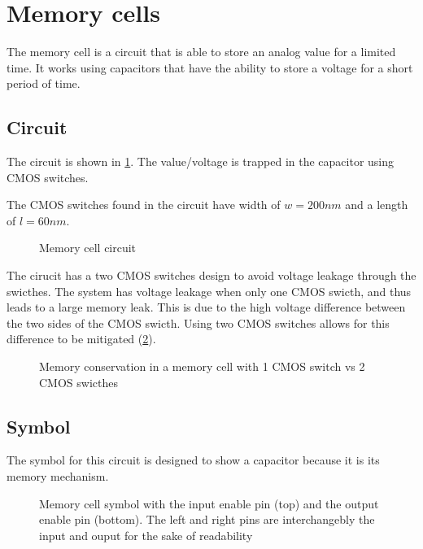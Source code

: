 \section{Memory cells}
\label{sec:memcell}

The memory cell is a circuit that is able to store an analog value for a limited time. It works using capacitors that have the ability to store a voltage for a short period of time.

\subsection{Circuit}

The circuit is shown in \cref{circt:memcell}. The value/voltage is trapped in the capacitor using \ac{CMOS} switches.

The \ac{CMOS} switches found in the circuit have width of $w=200nm$ and a length of $l=60nm$.

\begin{figure}[H]
  \centering
  
  \caption{Memory cell circuit}
  \label{circt:memcell}
\end{figure}

The cirucit has a two \ac{CMOS} switches design to avoid voltage leakage through the swicthes. The system has voltage leakage when only one \ac{CMOS} swicth, and thus leads to a large memory leak. This is due to the high voltage difference between the two sides of the \ac{CMOS} swicth. Using two \ac{CMOS} switches allows for this difference to be mitigated (\cref{fig:memcellLoss}).

\begin{figure}[H]
  \centering
  
  \caption{Memory conservation in a memory cell with 1 \ac{CMOS} switch vs 2 \ac{CMOS} swicthes}
  \label{fig:memcellLoss}
\end{figure}

\subsection{Symbol}

The symbol for this circuit is designed to show a capacitor because it is its memory mechanism.

\begin{figure}[H]
  \centering
  
  \caption{Memory cell symbol with the input enable pin (top) and the output enable pin (bottom). The left and right pins are interchangebly the input and ouput for the sake of readability}
  \label{sym:memcell}
\end{figure}

